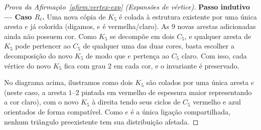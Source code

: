 \documentclass[reqno, 12pt]{amsart}
\numberwithin{equation}{section}
\theoremstyle{plain}
\theoremstyle{definition}
\begin{document}
\begin{proof}[Prova da Afirmação~\ref{afirm:vertex-exp} (Expansões de vértice)]
    \medskip\noindent\textbf{Passo indutivo --- Caso $R_\ell$.}
    Uma nova cópia de $K_5$ é colada à estrutura existente por uma única aresta $e$ já colorida (digamos, $e$ é vermelha/claro). As $9$ novas arestas adicionadas ainda não possuem cor.
    Como $K_5$ se decompõe em dois $C_5$, e qualquer aresta de $K_5$ pode pertencer ao $C_5$ de qualquer uma das duas cores, basta escolher a decomposição do novo $K_5$ de modo que $e$ pertença ao $C_5$ claro. Com isso, cada vértice do novo $K_5$ fica com grau $2$ em cada cor, e o invariante é preservado.

    \begin{center}
    \end{center}
    \noindent
    No diagrama acima, ilustramos como dois $K_5$ são colados por uma única aresta $e$ (neste caso, a aresta $1$--$2$ pintada em vermelho de espessura maior representando a cor claro), com o novo $K_5$ à direita tendo seus ciclos de $C_5$ vermelho e azul orientados de forma compatível. Como $e$ é a única ligação compartilhada, nenhum triângulo preexistente tem sua distribuição afetada.


\end{proof}
\end{document}
